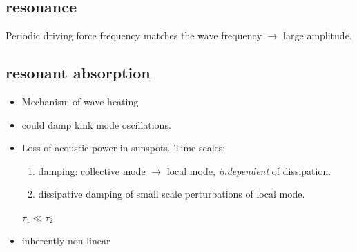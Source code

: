 \documentclass{article}
\begin{document}
\subsection{resonance}
Periodic driving force frequency matches the wave frequency
$\rightarrow$ large amplitude.
\subsection{resonant absorption}
\begin{itemize}
    \item Mechanism of wave heating
    \item could damp kink mode oscillations.
    \item Loss of acoustic power in sunspots. Time scales:
        \begin{enumerate}
            \item damping: collective mode $\rightarrow$ local mode,
                \emph{independent} of dissipation.
            \item dissipative damping of small scale perturbations of local
                mode.
        \end{enumerate}
        $\tau_1 \ll \tau_2$
    \item inherently non-linear
\end{itemize}
\end{document}
